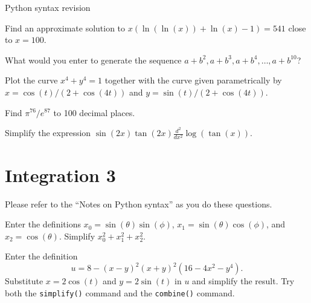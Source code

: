 \documentclass[a4paper,10pt]{amsbook}
\begin{document}
\begin{center}
 {\huge Python syntax revision}
\end{center}

\begin{exercise}
 Find an approximate solution to
 $x(\ln(\ln(x))+\ln(x)-1)=541$ close to $x=100$. 
\end{exercise}

\begin{exercise}
 What would you enter to generate the sequence
 $a+b^2,a+b^3,a+b^4,\dotsc,a+b^{10}$? 
\end{exercise}


\begin{exercise}
 Plot the curve $x^4+y^4=1$ together with the curve given
 parametrically by $x=\cos(t)/(2+\cos(4t))$ and
 $y=\sin(t)/(2+\cos(4t))$. 
\end{exercise}

\begin{exercise}
 Find $\pi^{76}/e^{87}$ to 100 decimal places.
\end{exercise}

\begin{exercise}
 Simplify the expression
 $\displaystyle \sin(2x)\tan(2x)\frac{d^2}{dx^2}\log(\tan(x))$.
\end{exercise}


\chapter{Integration 3}

Please refer to the ``Notes on Python syntax'' as you do
these questions.

\begin{exercise}
 Enter the definitions $x_0=\sin(\theta)\sin(\phi)$,
 $x_1=\sin(\theta)\cos(\phi)$, and $x_2=\cos(\theta)$.
 Simplify $x_0^2+x_1^2+x_2^2$.
\end{exercise}

\begin{exercise}
 Enter the definition
 \[ u = 8 - (x-y)^2 (x+y)^2 (16 - 4x^2 - y^4). \]
 Substitute $x=2\cos(t)$ and $y=2\sin(t)$ in $u$ and
 simplify the result.  Try both the \verb~simplify()~
 command and the \verb~combine()~ command.
\end{exercise}
\end{document}
